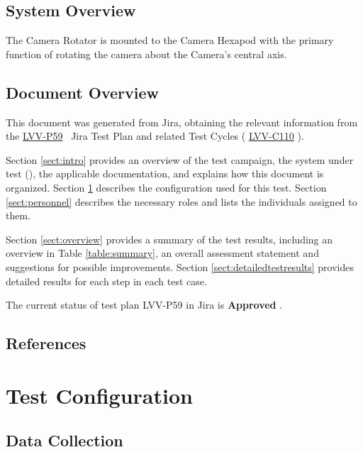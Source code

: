 \documentclass[SE,lsstdraft,STR,toc]{lsstdoc}
\begin{document}
\subsection{System Overview}
\label{sect:systemoverview}

The Camera Rotator is mounted to the Camera Hexapod with the primary
function of rotating the camera about the Camera's central axis.


\subsection{Document Overview}
\label{sect:docoverview}

This document was generated from Jira, obtaining the relevant information from the 
\href{https://jira.lsstcorp.org/secure/Tests.jspa#/testPlan/LVV-P59}{LVV-P59}
~Jira Test Plan and related Test Cycles (
  \href{https://jira.lsstcorp.org/secure/Tests.jspa#/testCycle/LVV-C110}{LVV-C110}
).

Section \ref{sect:intro} provides an overview of the test campaign, the system under test (\product{}), the applicable documentation, and explains how this document is organized.
Section \ref{sect:configuration}  describes the configuration used for this test.
Section \ref{sect:personnel} describes the necessary roles and lists the individuals assigned to them.

Section \ref{sect:overview} provides a summary of the test results, including an overview in Table \ref{table:summary}, an overall assessment statement and suggestions for possible improvements.
Section \ref{sect:detailedtestresults} provides detailed results for each step in each test case.

The current status of test plan LVV-P59 in Jira is \textbf{ Approved }.

\subsection{References}
\label{sect:references}
\renewcommand{\refname}{}

\section{Test Configuration}
\label{sect:configuration}

\subsection{Data Collection}
\end{document}
